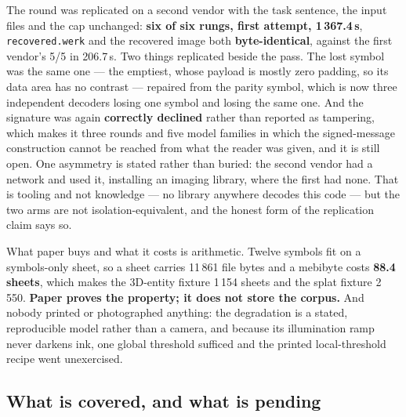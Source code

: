 \documentclass[10pt,twocolumn,letterpaper]{article}
\newcommand{\code}[1]{\texttt{\small #1}}
\begin{document}
The round was replicated on a second vendor with the task sentence, the input files and the cap unchanged: \textbf{six of six rungs, first attempt, 1\,367.4\,s}, \code{recovered.werk} and the recovered image both \textbf{byte-identical}, against the first vendor's 5/5 in 206.7\,s. Two things replicated beside the pass. The lost symbol was the same one --- the emptiest, whose payload is mostly zero padding, so its data area has no contrast --- repaired from the parity symbol, which is now three independent decoders losing one symbol and losing the same one. And the signature was again \textbf{correctly declined} rather than reported as tampering, which makes it three rounds and five model families in which the signed-message construction cannot be reached from what the reader was given, and it is still open. One asymmetry is stated rather than buried: the second vendor had a network and used it, installing an imaging library, where the first had none. That is tooling and not knowledge --- no library anywhere decodes this code --- but the two arms are not isolation-equivalent, and the honest form of the replication claim says so.

What paper buys and what it costs is arithmetic. Twelve symbols fit on a symbols-only sheet, so a sheet carries 11\,861 file bytes and a mebibyte costs \textbf{88.4 sheets}, which makes the 3D-entity fixture 1\,154 sheets and the splat fixture 2\,550. \textbf{Paper proves the property; it does not store the corpus.} And nobody printed or photographed anything: the degradation is a stated, reproducible model rather than a camera, and because its illumination ramp never darkens ink, one global threshold sufficed and the printed local-threshold recipe went unexercised.

\subsection{What is covered, and what is pending}
\end{document}
